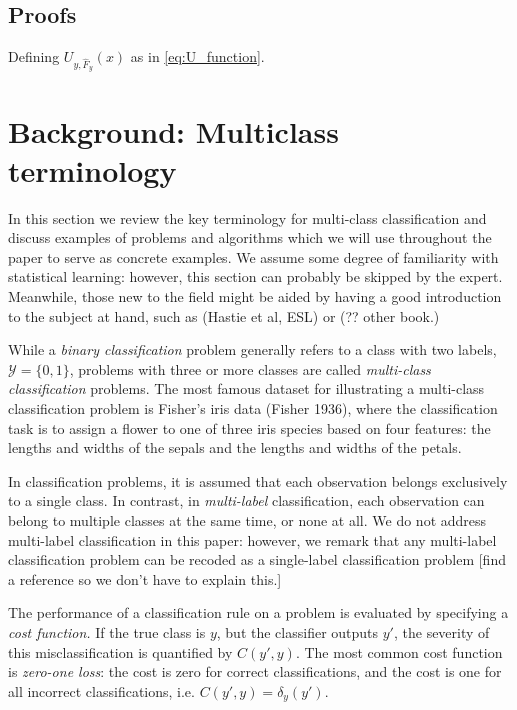 \documentclass[12pt]{article}
\begin{document}
\subsection{Proofs}

\begin{lemma}\label{lemma:U_function}
Defining $U_{y,\hat{F}_y}(x)$ as in \eqref{eq:U_function}.
\end{lemma}

\section{Background: Multiclass terminology}

In this section we review the key terminology for multi-class
classification and discuss examples of problems and algorithms which
we will use throughout the paper to serve as concrete examples.  We
assume some degree of familiarity with statistical learning: however,
this section can probably be skipped by the expert.  Meanwhile, those
new to the field might be aided by having a good introduction to the
subject at hand, such as (Hastie et al, ESL) or (?? other book.)

While a \emph{binary classification} problem generally refers to a
class with two labels, $\mathcal{Y} = \{0, 1\}$, problems with three
or more classes are called \emph{multi-class classification} problems.
The most famous dataset for illustrating a multi-class classification
problem is Fisher's iris data (Fisher 1936), where the classification
task is to assign a flower to one of three iris species based on four
features: the lengths and widths of the sepals and the lengths and
widths of the petals.

In classification problems, it is assumed that each observation
belongs exclusively to a single class.  In contrast,
in \emph{multi-label} classification, each observation can belong to
multiple classes at the same time, or none at all.  We do not address
multi-label classification in this paper: however, we remark that any
multi-label classification problem can be recoded as a single-label
classification problem [find a reference so we don't have to explain
this.]

The performance of a classification rule on a problem is evaluated by
specifying a \emph{cost function.}  If the true class is $y$, but the
classifier outputs $y'$, the severity of this misclassification is
quantified by $C(y', y)$.  The most common cost function
is \emph{zero-one loss}: the cost is zero for correct classifications,
and the cost is one for all incorrect classifications, i.e. $C(y', y)
= \delta_{y}(y').$
\end{document}
